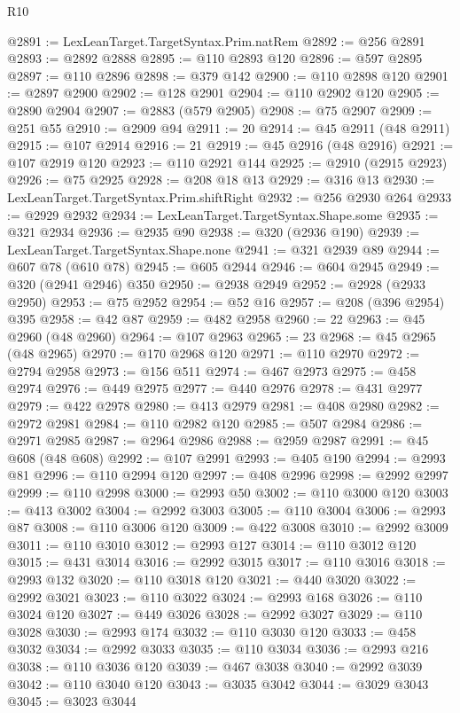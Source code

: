 \begin{lexlean}{R10}
\begin{coremodule}
@2891 := LexLeanTarget.TargetSyntax.Prim.natRem
@2892 := @256 @2891
@2893 := @2892 @2888
@2895 := @110 @2893 @120
@2896 := @597 @2895
@2897 := @110 @2896
@2898 := @379 @142
@2900 := @110 @2898 @120
@2901 := @2897 @2900
@2902 := @128 @2901
@2904 := @110 @2902 @120
@2905 := @2890 @2904
@2907 := @2883 (@579 @2905)
@2908 := @75 @2907
@2909 := @251 @55
@2910 := @2909 @94
@2911 := 20
@2914 := @45 @2911 (@48 @2911)
@2915 := @107 @2914
@2916 := 21
@2919 := @45 @2916 (@48 @2916)
@2921 := @107 @2919 @120
@2923 := @110 @2921 @144
@2925 := @2910 (@2915 @2923)
@2926 := @75 @2925
@2928 := @208 @18 @13
@2929 := @316 @13
@2930 := LexLeanTarget.TargetSyntax.Prim.shiftRight
@2932 := @256 @2930 @264
@2933 := @2929 @2932
@2934 := LexLeanTarget.TargetSyntax.Shape.some
@2935 := @321 @2934
@2936 := @2935 @90
@2938 := @320 (@2936 @190)
@2939 := LexLeanTarget.TargetSyntax.Shape.none
@2941 := @321 @2939 @89
@2944 := @607 @78 (@610 @78)
@2945 := @605 @2944
@2946 := @604 @2945
@2949 := @320 (@2941 @2946) @350
@2950 := @2938 @2949
@2952 := @2928 (@2933 @2950)
@2953 := @75 @2952
@2954 := @52 @16
@2957 := @208 (@396 @2954) @395
@2958 := @42 @87
@2959 := @482 @2958
@2960 := 22
@2963 := @45 @2960 (@48 @2960)
@2964 := @107 @2963
@2965 := 23
@2968 := @45 @2965 (@48 @2965)
@2970 := @170 @2968 @120
@2971 := @110 @2970
@2972 := @2794 @2958
@2973 := @156 @511
@2974 := @467 @2973
@2975 := @458 @2974
@2976 := @449 @2975
@2977 := @440 @2976
@2978 := @431 @2977
@2979 := @422 @2978
@2980 := @413 @2979
@2981 := @408 @2980
@2982 := @2972 @2981
@2984 := @110 @2982 @120
@2985 := @507 @2984
@2986 := @2971 @2985
@2987 := @2964 @2986
@2988 := @2959 @2987
@2991 := @45 @608 (@48 @608)
@2992 := @107 @2991
@2993 := @405 @190
@2994 := @2993 @81
@2996 := @110 @2994 @120
@2997 := @408 @2996
@2998 := @2992 @2997
@2999 := @110 @2998
@3000 := @2993 @50
@3002 := @110 @3000 @120
@3003 := @413 @3002
@3004 := @2992 @3003
@3005 := @110 @3004
@3006 := @2993 @87
@3008 := @110 @3006 @120
@3009 := @422 @3008
@3010 := @2992 @3009
@3011 := @110 @3010
@3012 := @2993 @127
@3014 := @110 @3012 @120
@3015 := @431 @3014
@3016 := @2992 @3015
@3017 := @110 @3016
@3018 := @2993 @132
@3020 := @110 @3018 @120
@3021 := @440 @3020
@3022 := @2992 @3021
@3023 := @110 @3022
@3024 := @2993 @168
@3026 := @110 @3024 @120
@3027 := @449 @3026
@3028 := @2992 @3027
@3029 := @110 @3028
@3030 := @2993 @174
@3032 := @110 @3030 @120
@3033 := @458 @3032
@3034 := @2992 @3033
@3035 := @110 @3034
@3036 := @2993 @216
@3038 := @110 @3036 @120
@3039 := @467 @3038
@3040 := @2992 @3039
@3042 := @110 @3040 @120
@3043 := @3035 @3042
@3044 := @3029 @3043
@3045 := @3023 @3044

\end{coremodule}
\end{lexlean}
